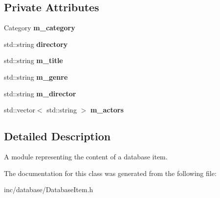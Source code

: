 \subsection*{Private Attributes}
\begin{DoxyCompactItemize}
\item 
\mbox{\label{classDatabaseItem_a9658a56bfb656a371ef1b1cec436b40b}} 
Category {\bfseries m\+\_\+category}
\item 
\mbox{\label{classDatabaseItem_a5ecbf8e196e110a738bb8ab1fbdff80b}} 
std\+::string {\bfseries directory}
\item 
\mbox{\label{classDatabaseItem_aae3a4413ab461a85af2e79c0491a4e51}} 
std\+::string {\bfseries m\+\_\+title}
\item 
\mbox{\label{classDatabaseItem_a31482f012b886663cd8f2374e5bfe715}} 
std\+::string {\bfseries m\+\_\+genre}
\item 
\mbox{\label{classDatabaseItem_ad83b8f7fe4c6de1a3440ee3397192b01}} 
std\+::string {\bfseries m\+\_\+director}
\item 
\mbox{\label{classDatabaseItem_af98cce4f0865b2bf17d6a484c17ffaf9}} 
std\+::vector$<$ std\+::string $>$ {\bfseries m\+\_\+actors}
\end{DoxyCompactItemize}


\subsection{Detailed Description}
A module representing the content of a database item. 



The documentation for this class was generated from the following file\+:\begin{DoxyCompactItemize}
\item 
inc/database/Database\+Item.\+h\end{DoxyCompactItemize}
